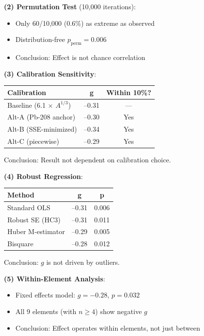 \textbf{(2) Permutation Test} (10,000 iterations):
\begin{itemize}
    \item Only 60/10,000 (0.6\%) as extreme as observed
    \item Distribution-free $p_{\text{perm}} = 0.006$
    \item Conclusion: Effect is not chance correlation
\end{itemize}

\textbf{(3) Calibration Sensitivity}:
\begin{center}
\begin{tabular}{lcc}
\hline
\textbf{Calibration} & \textbf{g} & \textbf{Within 10\%?} \\
\hline
Baseline (6.1 $\times$ $A^{1/3}$) & --0.31 & --- \\
Alt-A (Pb-208 anchor) & --0.30 & Yes \\
Alt-B (SSE-minimized) & --0.34 & Yes \\
Alt-C (piecewise) & --0.29 & Yes \\
\hline
\end{tabular}
\end{center}
Conclusion: Result not dependent on calibration choice.

\textbf{(4) Robust Regression}:
\begin{center}
\begin{tabular}{lcc}
\hline
\textbf{Method} & \textbf{g} & \textbf{p} \\
\hline
Standard OLS & --0.31 & 0.006 \\
Robust SE (HC3) & --0.31 & 0.011 \\
Huber M-estimator & --0.29 & 0.005 \\
Bisquare & --0.28 & 0.012 \\
\hline
\end{tabular}
\end{center}
Conclusion: $g$ is not driven by outliers.

\textbf{(5) Within-Element Analysis}:
\begin{itemize}
    \item Fixed effects model: $g = -0.28$, $p = 0.032$
    \item All 9 elements (with $n \geq 4$) show negative $g$
    \item Conclusion: Effect operates within elements, not just between
\end{itemize}

